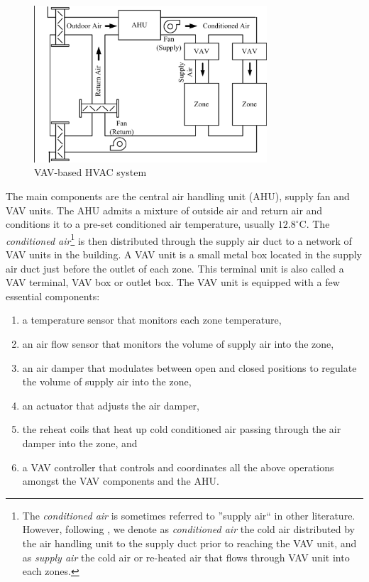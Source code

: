 \begin{figure}[ht]
\centering
\includegraphics[height=2.3in,keepaspectratio]{figs/background_vav.png}	
\caption{VAV-based HVAC system} 
\label{fig:background:vav}  
\end{figure}

The main components are the central air handling unit (AHU), supply fan and VAV units. The AHU admits a mixture of outside air and return air and conditions it to a pre-set conditioned air temperature, usually $12.8^{\circ}\mathrm{C}$. The \emph{\textsl{conditioned air}}\footnote{The \emph{\textsl{conditioned air}} is sometimes referred to ''supply air`` in other literature. However, following \cite{goyal2013occupancy}, we denote as \emph{\textsl{conditioned air}} the cold air distributed by the air handling unit to the supply duct prior to reaching the VAV unit, and as \emph{\textsl{supply air}} the cold air or re-heated air that flows through VAV unit into each zones.} is then distributed through the supply air duct to a network of VAV units in the building. %
A VAV unit is a small metal box located in the supply air duct just before the outlet of each zone. This terminal unit is also called a VAV terminal, VAV box or outlet box. 
The VAV unit is equipped with a few essential components:

\begin {enumerate} [label=\alph*\upshape)] %
\item a temperature sensor that monitors each zone temperature,
\item an air flow sensor that monitors the volume of supply air into the zone,
\item an air damper that modulates between open and closed positions to regulate the volume of supply air into the zone,
\item an actuator that adjusts the air damper,
\item the reheat coils that heat up cold conditioned air passing through the air damper into the zone, and 
\item a VAV controller that controls and coordinates all the above operations amongst the VAV components and the AHU.
\end {enumerate} 

